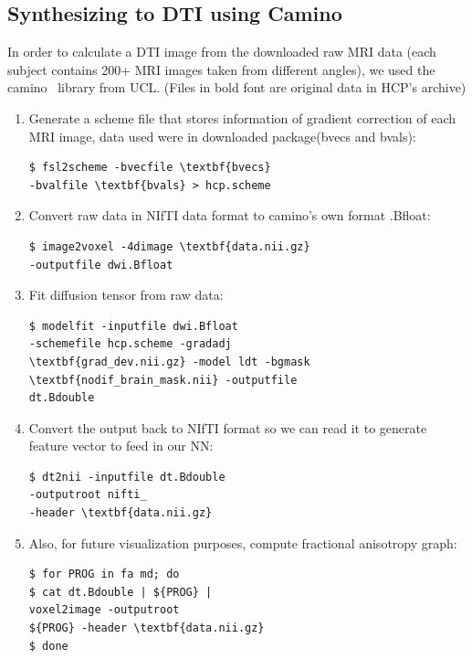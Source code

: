 \documentclass[10pt,twocolumn,letterpaper]{article}
\begin{document}
	\subsection{Synthesizing to DTI using Camino}
	In order to calculate a DTI image from the downloaded raw MRI data (each subject contains 200+ MRI images taken from different angles), we used the camino~\cite{cook2006camino} library from UCL.
	(Files in bold font are original data in HCP's archive)
	\begin{enumerate}
\item 
Generate a scheme file that stores information of gradient correction of each MRI image, data used were in downloaded package(bvecs and bvals):
\begin{Verbatim}[commandchars=\\\{\}]
$ fsl2scheme -bvecfile \textbf{bvecs} 
-bvalfile \textbf{bvals} > hcp.scheme
\end{Verbatim}


\item
Convert raw data in NIfTI data format to camino’s own format .Bfloat:
\begin{Verbatim}[commandchars=\\\{\}]
$ image2voxel -4dimage \textbf{data.nii.gz} 
-outputfile dwi.Bfloat
\end{Verbatim}


\item
Fit diffusion tensor from raw data:
\begin{Verbatim}[commandchars=\\\{\}]
$ modelfit -inputfile dwi.Bfloat 
-schemefile hcp.scheme -gradadj 
\textbf{grad_dev.nii.gz} -model ldt -bgmask 
\textbf{nodif_brain_mask.nii} -outputfile 
dt.Bdouble
\end{Verbatim}


\item
Convert the output back to NIfTI format so we can read it to generate feature vector to feed in our NN:
\begin{Verbatim}[commandchars=\\\{\}]
$ dt2nii -inputfile dt.Bdouble 
-outputroot nifti_ 
-header \textbf{data.nii.gz}
\end{Verbatim}


\item
Also, for future visualization purposes, compute fractional anisotropy graph:

\begin{Verbatim}[commandchars=\\\{\}]
$ for PROG in fa md; do
$ cat dt.Bdouble | ${PROG} | 
voxel2image -outputroot 
${PROG} -header \textbf{data.nii.gz}
$ done
\end{Verbatim}



	\end{enumerate}
	
\end{document}
